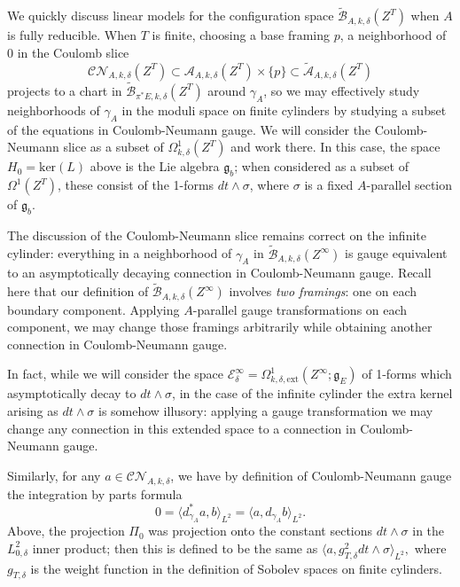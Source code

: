 \documentclass{memo-l}
\newcommand{\pE}{\pi^* \! E}
\theoremstyle{definition}
\theoremstyle{remark}
\numberwithin{section}{chapter}
\numberwithin{equation}{chapter}
\begin{document}
We quickly discuss linear models for the configuration space $\widetilde{\mathcal B}_{A,k,\delta}(Z^T)$ when $A$ is fully reducible. When $T$ is finite, choosing a base framing $p$, a neighborhood of $0$ in the Coulomb slice $$\mathcal{CN}_{A,k,\delta}(Z^T) \subset \mathcal A_{A,k,\delta}(Z^T) \times \{p\} \subset \widetilde{\mathcal A}_{A,k,\delta}(Z^T)$$ projects to a chart in $\widetilde{\mathcal B}_{\pE,k,\delta}(Z^T)$ around $\gamma_A$, so we may effectively study neighborhoods of $\gamma_A$ in the moduli space on finite cylinders by studying a subset of the equations in Coulomb-Neumann gauge. We will consider the Coulomb-Neumann slice as a subset of $\Omega^1_{k,\delta}(Z^T)$ and work there. In this case, the space $H_0 = \text{ker}(L)$ above is the Lie algebra $\mathfrak g_b$; when considered as a subset of $\Omega^1(Z^T)$, these consist of the 1-forms $dt \wedge \sigma$, where $\sigma$ is a fixed $A$-parallel section of $\mathfrak g_b$.

The discussion of the Coulomb-Neumann slice remains correct on the infinite cylinder: everything in a neighborhood of $\gamma_A$ in $\widetilde{\mathcal B}_{A,k,\delta}(Z^\infty)$ is gauge equivalent to an asymptotically decaying connection in Coulomb-Neumann gauge. Recall here that our definition of $\widetilde{\mathcal B}_{A,k,\delta}(Z^\infty)$ involves \emph{two framings}: one on each boundary component. Applying $A$-parallel gauge transformations on each component, we may change those framings arbitrarily while obtaining another connection in Coulomb-Neumann gauge.

In fact, while we will consider the space $\mathcal E^\infty_\delta = \Omega^1_{k,\delta,\text{ext}}(Z^\infty;\mathfrak g_E)$ of 1-forms which asymptotically decay to $dt \wedge \sigma$, in the case of the infinite cylinder the extra kernel arising as $dt \wedge \sigma$ is somehow illusory: applying a gauge transformation we may change any connection in this extended space to a connection in Coulomb-Neumann gauge.

Similarly, for any $a \in \mathcal{CN}_{A,k,\delta}$, we have by definition of Coulomb-Neumann gauge the integration by parts formula 
$$0 = \langle d_{\gamma_A}^* a, b \rangle_{L^2} = \langle a, d_{\gamma_A} b\rangle_{L^2}.$$ 
Above, the projection $\Pi_0$ was projection onto the constant sections $dt \wedge \sigma$ in the $L^2_{0,\delta}$ inner product; then this is defined to be the same as $\langle a, g_{T, \delta}^2 dt \wedge \sigma\rangle_{L^2},$ where $g_{T,\delta}$ is the weight function in the definition of Sobolev spaces on finite cylinders.
\end{document}
